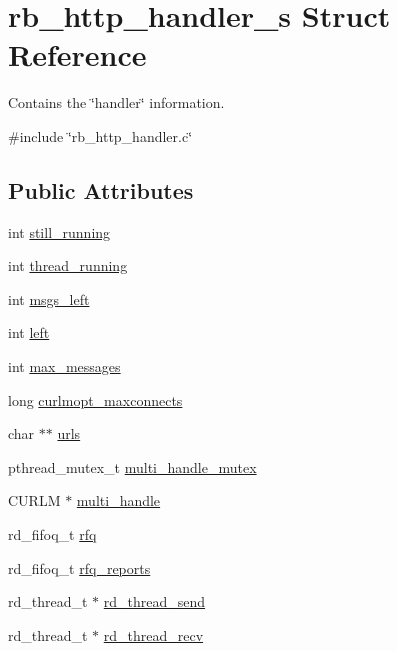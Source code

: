 \hypertarget{structrb__http__handler__s}{\section{rb\-\_\-http\-\_\-handler\-\_\-s Struct Reference}
\label{structrb__http__handler__s}
}


Contains the \char`\"{}handler\char`\"{} information.  




{\ttfamily \#include \char`\"{}rb\-\_\-http\-\_\-handler.\-c\char`\"{}}

\subsection*{Public Attributes}
\begin{DoxyCompactItemize}
\item 
int \hyperlink{structrb__http__handler__s_aa49e97bedda03106912088dad0b75e64}{still\-\_\-running}
\item 
int \hyperlink{structrb__http__handler__s_a978656c7c89a80d411121107c97a0dcd}{thread\-\_\-running}
\item 
int \hyperlink{structrb__http__handler__s_a803db851c00a617f8a80f00f29d9dba3}{msgs\-\_\-left}
\item 
int \hyperlink{structrb__http__handler__s_a6239490836609d286669af640028ae71}{left}
\item 
int \hyperlink{structrb__http__handler__s_ac8ff888740fc0f4c4365fa08fc7d044f}{max\-\_\-messages}
\item 
long \hyperlink{structrb__http__handler__s_a85973abbda4aeb9332a1b59d6aec69a7}{curlmopt\-\_\-maxconnects}
\item 
char $\ast$$\ast$ \hyperlink{structrb__http__handler__s_a651ea67df6280142010181fb0f418a19}{urls}
\item 
pthread\-\_\-mutex\-\_\-t \hyperlink{structrb__http__handler__s_add4e2b7495e2f20396c2e70ab1a27bf4}{multi\-\_\-handle\-\_\-mutex}
\item 
C\-U\-R\-L\-M $\ast$ \hyperlink{structrb__http__handler__s_a45c0ce1f2e4d154d0194bb60569c0faf}{multi\-\_\-handle}
\item 
rd\-\_\-fifoq\-\_\-t \hyperlink{structrb__http__handler__s_a39160211aefb64ec052138229da98632}{rfq}
\item 
rd\-\_\-fifoq\-\_\-t \hyperlink{structrb__http__handler__s_a383f2047cfcdd9fe49d0deacf770a73c}{rfq\-\_\-reports}
\item 
rd\-\_\-thread\-\_\-t $\ast$ \hyperlink{structrb__http__handler__s_ab7856bbe03f6e21d3c4663b19d043454}{rd\-\_\-thread\-\_\-send}
\item 
rd\-\_\-thread\-\_\-t $\ast$ \hyperlink{structrb__http__handler__s_ac22f049e3d329afb6b7b3eea9310fae8}{rd\-\_\-thread\-\_\-recv}
\end{DoxyCompactItemize}


